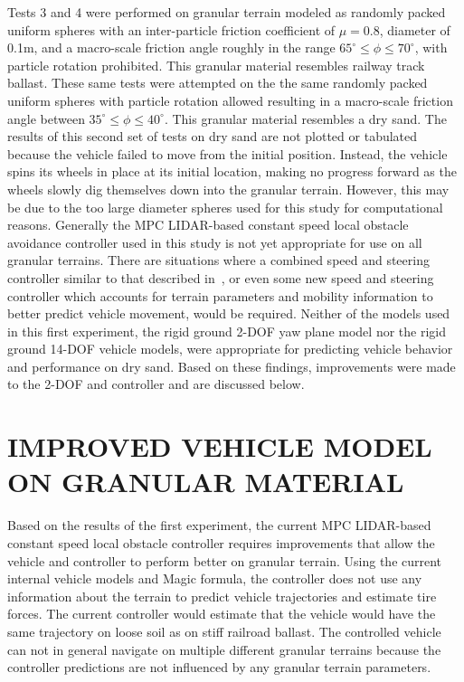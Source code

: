 \documentclass[12pt,onecolumn]{report}
\begin{document}
Tests 3 and 4 were performed on granular terrain modeled as randomly packed uniform spheres with an inter-particle friction coefficient of $\mu = 0.8$, diameter of 0.1m, and a macro-scale friction angle roughly in the range $65^\circ \leq \phi \leq 70^\circ$, with particle rotation prohibited. This granular material resembles railway track ballast. These same tests were attempted on the the same randomly packed uniform spheres with particle rotation allowed resulting in a macro-scale friction angle between $35^\circ \leq \phi \leq 40^\circ$. This granular material resembles a dry sand. The results of this second set of tests on dry sand are not plotted or tabulated because the vehicle failed to move from the initial position. Instead, the vehicle spins its wheels in place at its initial location, making no progress forward as the wheels slowly dig themselves down into the granular terrain. However, this may be due to the too large diameter spheres used for this study for computational reasons. Generally the MPC LIDAR-based constant speed local obstacle avoidance controller used in this study is not yet appropriate for use on all granular terrains. There are situations where a combined speed and steering controller similar to that described in~\cite{SpeedSteer2015}, or even some new speed and steering controller which accounts for terrain parameters and mobility information to better predict vehicle movement, would be required. Neither of the models used in this first experiment, the rigid ground 2-DOF yaw plane model nor the rigid ground 14-DOF vehicle models, were appropriate for predicting vehicle behavior and performance on dry sand. Based on these findings, improvements were made to the 2-DOF and controller and are discussed below.


\chapter{IMPROVED VEHICLE MODEL ON GRANULAR MATERIAL}\label{c:improvedModel}

Based on the results of the first experiment, the current MPC LIDAR-based constant speed local obstacle controller requires improvements that allow the vehicle and controller to perform better on granular terrain. Using the current internal vehicle models and Magic formula, the controller does not use any information about the terrain to predict vehicle trajectories and estimate tire forces. The current controller would estimate that the vehicle would have the same trajectory on loose soil as on stiff railroad ballast. The controlled vehicle can not in general navigate on multiple different granular terrains because the controller predictions are not influenced by any granular terrain parameters. 
\end{document}
